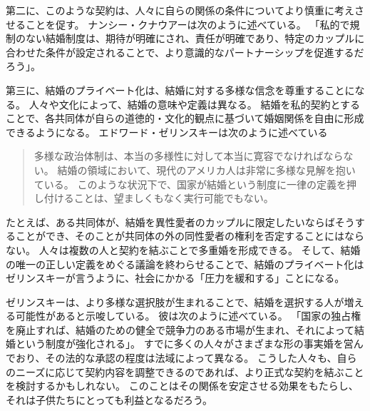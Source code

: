 \documentclass[paper=a4,book,openany]{jlreq}
\begin{document}
第二に、このような契約は、人々に自らの関係の条件についてより慎重に考えさせることを促す。
ナンシー・クナウアーは次のように述べている。
「私的で規制のない結婚制度は、期待が明確にされ、責任が明確であり、特定のカップルに合わせた条件が設定されることで、より意識的なパートナーシップを促進するだろう」\citep[p.103]{knauer06:_marriag_skept_respon_pro_marriag}。

第三に、結婚のプライベート化は、結婚に対する多様な信念を尊重することになる。
人々や文化によって、結婚の意味や定義は異なる。
結婚を私的契約とすることで、各共同体が自らの道徳的・文化的観点に基づいて婚姻関係を自由に形成できるようになる。
エドワード・ゼリンスキーは次のように述べている

\begin{quote}
多様な政治体制は、本当の多様性に対して本当に寛容でなければならない。
結婚の領域において、現代のアメリカ人は非常に多様な見解を抱いている。
このような状況下で、国家が結婚という制度に一律の定義を押し付けることは、望ましくもなく実行可能でもない。
\citep{zelinsky08:_marriag}
\end{quote}

たとえば、ある共同体が、結婚を異性愛者のカップルに限定したいならばそうすることができ、そのことが共同体の外の同性愛者の権利を否定することにはならない。
人々は複数の人と契約を結ぶことで多重婚を形成できる。
そして、結婚の唯一の正しい定義をめぐる議論を終わらせることで、結婚のプライベート化はゼリンスキーが言うように、社会にかかる「圧力を緩和する」ことになる\citep[pp.1178--1179]{zelinsky06:_dereg_marriag}。

ゼリンスキーは、より多様な選択肢が生まれることで、結婚を選択する人が増える可能性があると示唆している。
彼は次のように述べている。
「国家の独占権を廃止すれば、結婚のための健全で競争力のある市場が生まれ、それによって結婚という制度が強化される」\citep[p.1164]{zelinsky06:_dereg_marriag}。
すでに多くの人々がさまざまな形の事実婚を営んでおり、その法的な承認の程度は法域によって異なる。
こうした人々も、自らのニーズに応じて契約内容を調整できるのであれば、より正式な契約を結ぶことを検討するかもしれない。
このことはその関係を安定させる効果をもたらし、それは子供たちにとっても利益となるだろう。
\end{document}
